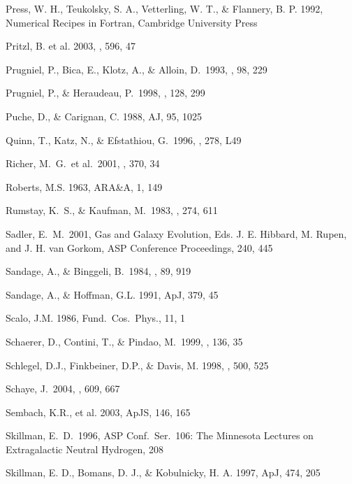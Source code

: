 \documentclass[12pt,preprint]{aastex}
\begin{document}
\begin{thebibliography}{}
Press, W. H., Teukolsky, S. A., Vetterling, W. T., \& Flannery, B. P. 1992,
Numerical Recipes in Fortran, Cambridge University Press

Pritzl, B. et al. 2003, \apj, 596, 47

Prugniel, P., Bica, E., Klotz, A., \& Alloin, D.\ 1993, \aaps, 98, 229 

Prugniel, P., \& Heraudeau, P.\ 1998, \aaps, 128, 299 

Puche, D., \& Carignan, C. 1988, AJ, 95, 1025

Quinn, T., Katz, N., \& Efstathiou, G.\ 1996, \mnras, 278, L49 

Richer, M.~G.~et al.\ 2001, \aap, 370, 34 

Roberts, M.S. 1963, ARA\&A, 1, 149

Rumstay, K.~S., \& Kaufman, M.\ 1983, \apj, 274, 611 

Sadler, E.~M.\ 2001, Gas and Galaxy Evolution, 
Eds. J. E. Hibbard, M. Rupen, and J. H. van Gorkom,
ASP Conference Proceedings, 240, 445 

Sandage, A., \& Binggeli, B.\ 1984, \aj, 89, 919

Sandage, A., \& Hoffman, G.L. 1991, ApJ, 379, 45

Scalo, J.M. 1986, Fund.\ Cos.\ Phys., 11, 1

Schaerer, D., Contini, T., \& Pindao, M.\ 1999, \aaps, 136, 35 

Schlegel, D.J., Finkbeiner, D.P., \& Davis, M. 1998, \apj , 500, 525

Schaye, J.\ 2004, \apj, 609, 667 

Sembach, K.R., et al. 2003, ApJS, 146, 165

Skillman, E.~D.\ 1996, ASP Conf.~Ser.~106: 
The Minnesota Lectures on Extragalactic Neutral Hydrogen, 208 

Skillman, E. D., Bomans, D. J., \& Kobulnicky, H. A.  
1997, ApJ, 474, 205


\end{thebibliography}
\end{document}
